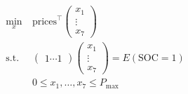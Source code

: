\documentclass[preview]{standalone}
\begin{document}
\begin{align*}
\begin{aligned}\min_{x} &\ \text{prices}^\top \begin{pmatrix} x_1\\ \vdots\\ x_7 \end{pmatrix} \\\text{s.t.} &\ \begin{pmatrix} 1 \cdots 1 \end{pmatrix} \begin{pmatrix} x_1\\ \vdots\\ x_7 \end{pmatrix} = E\left(\text{SOC}=1\right) \\&\ 0 \leq x_1, \ldots , x_7 \leq P_\text{max} \end{aligned}
\end{align*}
\end{document}
